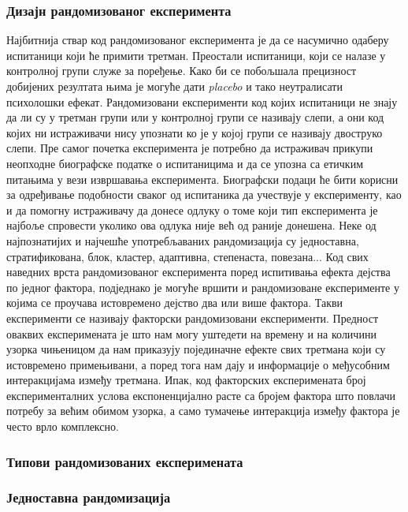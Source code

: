 \documentclass[12pt, a4paper]{article}
\begin{document}
\subsubsection{Дизајн рандомизованог експеримента}

Најбитнија ствар код рандомизованог експеримента је да се насумично одаберу испитаници који ће 
примити третман. Преостали испитаници, који се налазе у контролној групи служе за поређење. 
Како би се побољшала прецизност добијених резултата њима је могуће дати \textit{placebo} и тако 
неутралисати психолошки ефекат. Рандомизовани експерименти код којих испитаници не знају да ли су 
у третман групи или у контролној групи се називају слепи, а они код којих ни истраживачи нису 
упознати ко је у којој групи се називају двоструко слепи. Пре самог почетка експеримента је 
потребно да истраживач прикупи неопходне биографске податке о испитаницима и да се упозна са 
етичким питањима у вези извршавања експеримента. Биографски подаци ће бити корисни за одређивање 
подобности сваког од испитаника да учествује у експерименту, као и да помогну истраживачу да 
донесе одлуку о томе који тип експеримента је најбоље спровести уколико ова одлука није већ од 
раније донешена. Неке од најпознатијих и најчешће употребљаваних рандомизација су једноставна, 
стратификована, блок, кластер, адаптивна, степенаста, повезана...
Код свих наведних врста рандомизованог експеримента поред испитивања ефекта дејства по једног 
фактора, подједнако је могуће вршити и рандомизоване експерименте у којима се проучава 
истовремено дејство два или више фактора. Такви експерименти се називају факторски рандомизовани 
експерименти. Предност оваквих експеримената је што нам могу уштедети на времену и на количини 
узорка чињеницом да нам приказују појединачне ефекте свих третмана који су истовремено примењивани, 
а поред тога нам дају и информације о међусобним интеракцијама између третмана. Ипак, код 
факторских експеримената број експерименталних услова експоненцијално расте са бројем фактора што 
повлачи потребу за већим обимом узорка, а само тумачење интеракција између фактора је често врло 
комплексно.

\subsubsection{Типови рандомизованих експеримената}
\subsubsection*{Једноставна рандомизација}
\end{document}
